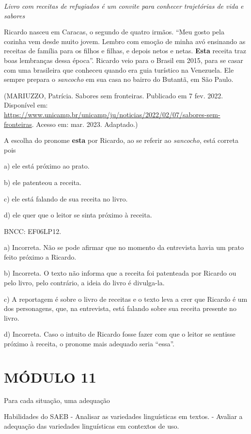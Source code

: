 {\emph{Livro com receitas de refugiados é um convite para conhecer
trajetórias de vida e sabores}

Ricardo nasceu em Caracas, o segundo de quatro irmãos. ``Meu gosto pela
cozinha vem desde muito jovem. Lembro com emoção de minha avó ensinando
as receitas de família para os filhos e filhas, e depois netos e netas.
\textbf{Esta} receita traz boas lembranças dessa época''. Ricardo veio
para o Brasil em 2015, para se casar com uma brasileira que conheceu
quando era guia turístico na Venezuela. Ele sempre prepara o
\emph{sancocho} em sua casa no bairro do Butantã, em São Paulo.

(MARIUZZO, Patrícia. Sabores sem fronteiras. Publicado em 7 fev. 2022.
Disponível em:
\url{https://www.unicamp.br/unicamp/ju/noticias/2022/02/07/sabores-sem-fronteiras}.
Acesso em: mar. 2023. Adaptado.)

A escolha do pronome \textbf{esta} por Ricardo, ao se referir ao
\emph{sancocho}, está correta pois

a) ele está próximo ao prato.

b) ele patenteou a receita.

c) ele está falando de sua receita no livro.

d) ele quer que o leitor se sinta próximo à receita.

BNCC: EF06LP12.

a) Incorreta. Não se pode afirmar que no momento da entrevista havia um
prato feito próximo a Ricardo.

b) Incorreta. O texto não informa que a receita foi patenteada por
Ricardo ou pelo livro, pelo contrário, a ideia do livro é divulga-la.

c) A reportagem é sobre o livro de receitas e o texto leva a crer que
Ricardo é um dos personagens, que, na entrevista, está falando sobre sua
receita presente no livro.

d) Incorreta. Caso o intuito de Ricardo fosse fazer com que o leitor se
sentisse próximo à receita, o pronome mais adequado seria ``essa''.

\section{MÓDULO 11}

Para cada situação, uma adequação

Habilidades do SAEB - Analisar as variedades linguísticas em textos. -
Avaliar a adequação das variedades linguísticas em contextos de uso.

}
